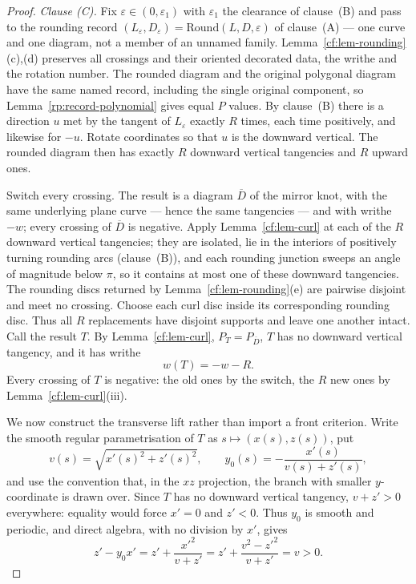 \begin{proof}
\emph{Clause (C).} Fix $\varepsilon\in(0,\varepsilon_1)$ with $\varepsilon_1$ the clearance of
clause~(B) and pass to the rounding record
$(L_\varepsilon,D_\varepsilon)=\mathrm{Round}(L,D,\varepsilon)$ of
clause~(A) --- one curve and one diagram, not a member
of an unnamed family. Lemma~\ref{cf:lem-rounding}(c),(d) preserves all crossings and their
oriented decorated data, the writhe and the rotation number. The rounded
diagram and the original polygonal diagram have the same named record,
including the single original component, so
Lemma~\ref{rp:record-polynomial} gives equal $P$ values. By clause~(B) there is a direction $u$ met by the tangent of
$L_\varepsilon$ exactly $R$ times, each time positively, and likewise for
$-u$. Rotate coordinates so
that $u$ is the downward vertical. The rounded diagram then has exactly $R$
downward vertical tangencies and $R$ upward ones.

Switch every crossing. The result is a diagram $\overline D$ of the mirror knot,
with the same underlying plane curve --- hence the same tangencies --- and with
writhe $-w$; every crossing of $\overline D$ is negative. Apply
Lemma~\ref{cf:lem-curl} at each of the $R$ downward vertical tangencies; they are
isolated, lie in the interiors of positively turning rounding arcs
(clause~(B)), and each rounding junction sweeps an angle of magnitude below $\pi$, so it
contains at most one of these downward tangencies. The rounding discs
returned by Lemma~\ref{cf:lem-rounding}(e) are pairwise disjoint and meet no
crossing. Choose each curl disc inside its corresponding rounding disc.
Thus all $R$ replacements have disjoint supports and leave one another
intact. Call the result $T$. By
Lemma~\ref{cf:lem-curl}, $P_T=P_{\overline D}$, $T$ has no downward vertical
tangency, and it has writhe
\[
w(T)=-w-R .
\]
Every crossing of $T$ is negative: the old ones by the switch, the $R$ new ones by
Lemma~\ref{cf:lem-curl}(iii).

We now construct the transverse lift rather than import a
front criterion.  Write the smooth regular parametrisation of $T$ as
$s\mapsto(x(s),z(s))$, put
\[
 v(s)=\sqrt{x'(s)^2+z'(s)^2},\qquad
 y_0(s)=-\frac{x'(s)}{v(s)+z'(s)},
\]
and use the convention that, in the $xz$ projection, the branch with smaller
$y$-coordinate is drawn over.  Since $T$ has no downward vertical tangency,
$v+z'>0$ everywhere: equality would force $x'=0$ and $z'<0$.  Thus $y_0$ is
smooth and periodic, and direct algebra, with no division by $x'$, gives
\[
 z'-y_0x'=z'+\frac{x'^2}{v+z'}
 =z'+\frac{v^2-z'^2}{v+z'}=v>0.                 \tag{*}
\]


\end{proof}
